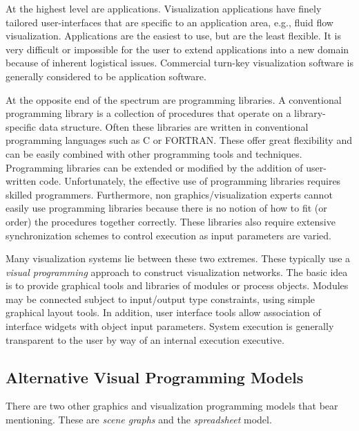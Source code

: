 At the highest level are applications. Visualization applications have finely tailored user-interfaces that are specific to an application area, e.g., fluid flow visualization. Applications are the easiest to use, but are the least flexible. It is very difficult or impossible for the user to extend applications into a new domain because of inherent logistical issues. Commercial turn-key visualization software is generally considered to be application software.

At the opposite end of the spectrum are programming libraries. A conventional programming library is a collection of procedures that operate on a library-specific data structure. Often these libraries are written in conventional programming languages such as C or FORTRAN. These offer great flexibility and can be easily combined with other programming tools and techniques. Programming libraries can be extended or modified by the addition of user-written code. Unfortunately, the effective use of programming libraries requires skilled programmers. Furthermore, non graphics/visualization experts cannot easily use programming libraries because there is no notion of how to fit (or order) the procedures together correctly. These libraries also require extensive synchronization schemes to control execution as input parameters are varied.

Many visualization systems lie between these two extremes. These typically use a \emph{visual programming} approach to construct visualization networks. The basic idea is to provide graphical tools and libraries of modules or process objects. Modules may be connected subject to input/output type constraints, using simple graphical layout tools. In addition, user interface tools allow association of interface widgets with object input parameters. System execution is generally transparent to the user by way of an internal execution executive.

\subsection{Alternative Visual Programming Models}
\label{subsec:alternative_visual_programming_models}

There are two other graphics and visualization programming models that bear mentioning. These are \emph{scene graphs} and the \emph{spreadsheet} model. 

